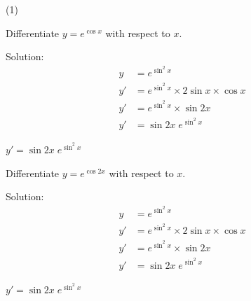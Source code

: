 \begin{mtask}(1)
   \task \begin{exercise} Differentiate $y=e^{\cos x}$ with respect to $x$.
             \begin{envSolution}
			      Solution:
			      \begin{align*}
			           y & =e^{\sin ^{2} x}                               \\[15pt]
                       y' & =e^{\sin ^{2} x} \times 2\sin x \times \cos x \\[10pt]
   					   y' & =e^{\sin ^{2} x} \times \sin 2x               \\[10pt]
   					   y' & =\sin 2x \; e^{\sin ^{2} x}                  
				 \end{align*}
                 \begin{shortsolution}  
				       $y' =\sin 2x \; e^{\sin ^{2} x}$
			     \end{shortsolution}				 
               \end{envSolution}
         \end{exercise}

   \task \begin{exercise} Differentiate $y=e^{\cos{2x}}$ with respect to $x$.
             \begin{envSolution}
			      Solution:
			      \begin{align*}
			           y & =e^{\sin ^{2} x}                               \\[15pt]
                       y' & =e^{\sin ^{2} x} \times 2\sin x \times \cos x \\[10pt]
   					   y' & =e^{\sin ^{2} x} \times \sin 2x               \\[10pt]
   					   y' & =\sin 2x \; e^{\sin ^{2} x}                  
				 \end{align*}
                 \begin{shortsolution}  
				       $y' =\sin 2x \; e^{\sin ^{2} x}$
			     \end{shortsolution}				 
               \end{envSolution}
         \end{exercise}


\end{mtask}
